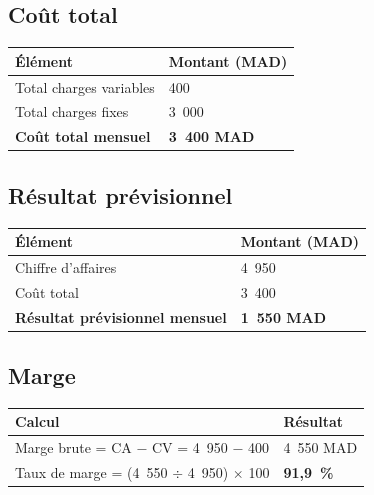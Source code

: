 \documentclass[12pt,a4paper]{report}
\newcommand{\hdr}[1]{\cellcolor{gray!15}\textbf{#1}}
\newcommand{\rowA}{\rowcolor{gray!8}}
\begin{document}
\subsection{Coût total}

\begin{table}[H]
\centering
\begin{tabular}{p{6cm}p{4cm}}
\toprule
\hdr{Élément} & \hdr{Montant (MAD)} \\
\midrule
Total charges variables & 400 \\
\rowA Total charges fixes & 3~000 \\
\midrule
\rowcolor{gray!12}\textbf{Coût total mensuel} & \textbf{3~400 MAD} \\
\bottomrule
\end{tabular}
\end{table}

\subsection{Résultat prévisionnel}

\begin{table}[H]
\centering
\begin{tabular}{p{6cm}p{4cm}}
\toprule
\hdr{Élément} & \hdr{Montant (MAD)} \\
\midrule
Chiffre d'affaires & 4~950 \\
\rowA Coût total & 3~400 \\
\midrule
\rowcolor{gray!12}\textbf{Résultat prévisionnel mensuel} & \textbf{1~550 MAD} \\
\bottomrule
\end{tabular}
\end{table}

\subsection{Marge}

\begin{table}[H]
\centering
\begin{tabular}{p{7cm}p{4cm}}
\toprule
\hdr{Calcul} & \hdr{Résultat} \\
\midrule
Marge brute = CA $-$ CV = 4~950 $-$ 400 & 4~550 MAD \\
\rowA Taux de marge = (4~550 $\div$ 4~950) $\times$ 100 & \textbf{91,9~\%} \\
\bottomrule
\end{tabular}
\end{table}
\end{document}
